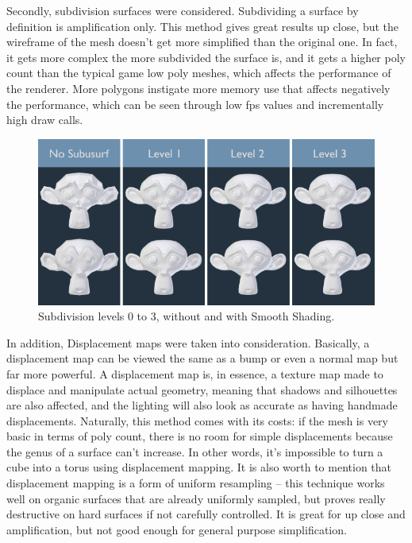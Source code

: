 \documentclass[10pt,journal,compsoc]{IEEEtran}
\begin{document}
\par Secondly, subdivision surfaces were considered. Subdividing a surface by definition is amplification only. This method gives great results up close, but the wireframe of the mesh doesn't get more simplified than the original one. In fact, it gets more complex the more subdivided the surface is, and it gets a higher poly count than the typical game low poly meshes, which affects the performance of the renderer. More polygons instigate more memory use that affects negatively the performance, which can be seen through low fps values and incrementally high draw calls. %

\begin{figure}[H]
    \centering
    \includegraphics[scale=0.3]{img/subdivision.png}
    \caption{Subdivision levels 0 to 3, without and with Smooth Shading\cite{subdiv}.}
    \label{fig:subdivision}
\end{figure}

In addition, Displacement maps were taken into consideration. Basically, a displacement map can be viewed the same as a bump or even a normal map but far more powerful. A displacement map is, in essence, a texture map made to displace and manipulate actual geometry, meaning that shadows and silhouettes are also affected, and the lighting will also look as accurate as having handmade displacements. Naturally, this method comes with its costs: if the mesh is very basic in terms of poly count, there is no room for simple displacements because the genus of a surface can't increase. In other words, it's impossible to turn a cube into a torus using displacement mapping. It is also worth to mention that displacement mapping is a form of uniform resampling – this technique works well on organic surfaces that are already uniformly sampled, but proves really destructive on hard surfaces if not carefully controlled. It is great for up close and amplification, but not good enough for general purpose simplification.
\end{document}
